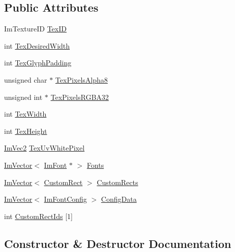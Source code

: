 \subsection*{Public Attributes}
\begin{DoxyCompactItemize}
\item 
Im\+Texture\+ID \hyperlink{struct_im_font_atlas_a1d7be9a6190c75706f80bda16c87f28e}{Tex\+ID}
\item 
int \hyperlink{struct_im_font_atlas_aa1d62d7da5633f894dbe881547e9de7c}{Tex\+Desired\+Width}
\item 
int \hyperlink{struct_im_font_atlas_a32034b2aac4616d8c27ee666a1fd1b62}{Tex\+Glyph\+Padding}
\item 
unsigned char $\ast$ \hyperlink{struct_im_font_atlas_a443ea9e7c4cf85ee791ffe891280eff3}{Tex\+Pixels\+Alpha8}
\item 
unsigned int $\ast$ \hyperlink{struct_im_font_atlas_a41163489a5b8060f405c56e22590cba5}{Tex\+Pixels\+R\+G\+B\+A32}
\item 
int \hyperlink{struct_im_font_atlas_a2d0662502433e7a87b3aa4681ba17aa3}{Tex\+Width}
\item 
int \hyperlink{struct_im_font_atlas_a5ef74d37ec01d9e8aac5c57433296ce3}{Tex\+Height}
\item 
\hyperlink{struct_im_vec2}{Im\+Vec2} \hyperlink{struct_im_font_atlas_af1d05221e9a1607d7f625df92a4f9b7e}{Tex\+Uv\+White\+Pixel}
\item 
\hyperlink{class_im_vector}{Im\+Vector}$<$ \hyperlink{struct_im_font}{Im\+Font} $\ast$ $>$ \hyperlink{struct_im_font_atlas_a0198aeb17ef8bb810ccc8db103b93b1f}{Fonts}
\item 
\hyperlink{class_im_vector}{Im\+Vector}$<$ \hyperlink{struct_im_font_atlas_1_1_custom_rect}{Custom\+Rect} $>$ \hyperlink{struct_im_font_atlas_a6289931d958f734fdc2ac1fadec99577}{Custom\+Rects}
\item 
\hyperlink{class_im_vector}{Im\+Vector}$<$ \hyperlink{struct_im_font_config}{Im\+Font\+Config} $>$ \hyperlink{struct_im_font_atlas_afa4f7459807763d032fe2d0022fc0823}{Config\+Data}
\item 
int \hyperlink{struct_im_font_atlas_a608ad12c2ccf1eed97b63454e52ccbe8}{Custom\+Rect\+Ids} \mbox{[}1\mbox{]}
\end{DoxyCompactItemize}


\subsection{Constructor \& Destructor Documentation}
\hypertarget{struct_im_font_atlas_aa34e7909d30440d5c35aaef990ac741e}{}\label{struct_im_font_atlas_aa34e7909d30440d5c35aaef990ac741e} 
